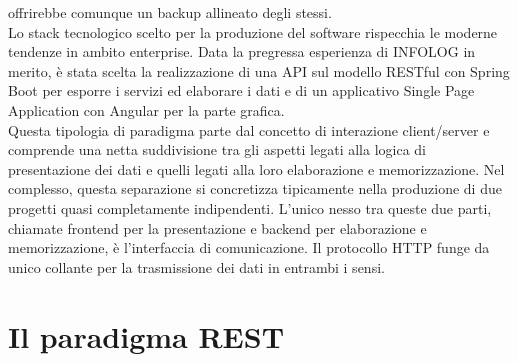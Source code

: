 offrirebbe comunque un backup allineato degli stessi.
\\
Lo stack tecnologico scelto per la produzione del software rispecchia le moderne tendenze in ambito enterprise.
Data la pregressa esperienza di INFOLOG in merito, è stata scelta la realizzazione di una API sul modello RESTful con Spring Boot per esporre i servizi ed elaborare i dati
e di un applicativo Single Page Application con Angular per la parte grafica.
\\
Questa tipologia di paradigma parte dal concetto di interazione client/server e comprende una netta suddivisione tra gli aspetti legati alla logica di presentazione dei dati
e quelli legati alla loro elaborazione e memorizzazione.
Nel complesso, questa separazione si concretizza tipicamente nella produzione di due progetti quasi completamente indipendenti.
L'unico nesso tra queste due parti, chiamate frontend per la presentazione e backend per elaborazione e memorizzazione, è l'interfaccia di comunicazione.
Il protocollo HTTP funge da unico collante per la trasmissione dei dati in entrambi i sensi.

\section{Il paradigma REST}

